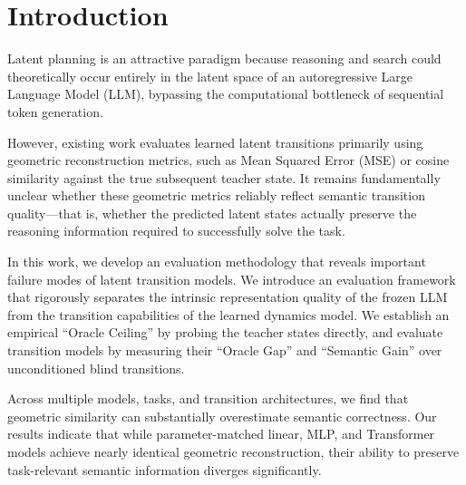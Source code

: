 \section{Introduction}

Latent planning is an attractive paradigm because reasoning and search could theoretically occur entirely in the latent space of an autoregressive Large Language Model (LLM), bypassing the computational bottleneck of sequential token generation.

However, existing work evaluates learned latent transitions primarily using geometric reconstruction metrics, such as Mean Squared Error (MSE) or cosine similarity against the true subsequent teacher state. It remains fundamentally unclear whether these geometric metrics reliably reflect semantic transition quality---that is, whether the predicted latent states actually preserve the reasoning information required to successfully solve the task.

In this work, we develop an evaluation methodology that reveals important failure modes of latent transition models. We introduce an evaluation framework that rigorously separates the intrinsic representation quality of the frozen LLM from the transition capabilities of the learned dynamics model. We establish an empirical ``Oracle Ceiling'' by probing the teacher states directly, and evaluate transition models by measuring their ``Oracle Gap'' and ``Semantic Gain'' over unconditioned blind transitions.

Across multiple models, tasks, and transition architectures, we find that geometric similarity can substantially overestimate semantic correctness. Our results indicate that while parameter-matched linear, MLP, and Transformer models achieve nearly identical geometric reconstruction, their ability to preserve task-relevant semantic information diverges significantly.

